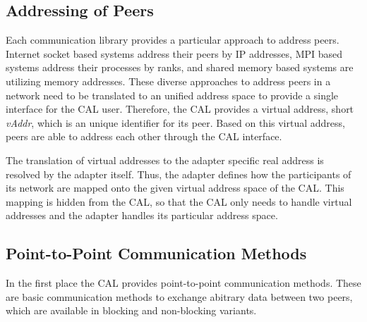 \subsection{Addressing of Peers}
Each communication library provides a particular approach to address
peers. Internet socket based systems
address their peers by IP addresses, MPI based systems address their
processes by ranks, and shared memory based systems are utilizing
memory addresses.  These diverse approaches to address peers in a
network need to be translated to an unified address space to provide a
single interface for the CAL user.  Therefore, the CAL provides a
virtual address, short \emph{vAddr}, which is an unique identifier for
its peer. Based on this virtual address, peers are able to address
each other through the CAL interface.

The translation of virtual addresses to the adapter specific real
address is resolved by the adapter itself. Thus, the adapter defines
how the participants of its network are mapped onto the given virtual
address space of the CAL. This mapping is hidden from the CAL, so that
the CAL only needs to handle virtual addresses and the adapter handles
its particular address space.

\subsection{Point-to-Point Communication Methods}
\label{sec:des:p2p}

In the first place the CAL provides point-to-point communication
methods. These are basic communication methods to exchange abitrary
data between two peers, which are available in blocking and
non-blocking variants.

